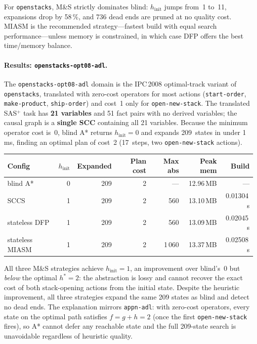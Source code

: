 \documentclass[11pt,a4paper]{article}
\begin{document}
For \texttt{openstacks}, M\&S strictly dominates blind: $h_{\mathrm{init}}$
jumps from~1 to~11, expansions drop by 58\,\%, and 736 dead ends are pruned
at no quality cost.  MIASM is the recommended strategy---fastest build with
equal search performance---unless memory is constrained, in which case DFP
offers the best time/memory balance.

\paragraph{Results: \texttt{openstacks-opt08-adl}.}

The \texttt{openstacks-opt08-adl} domain is the IPC\,2008 optimal-track
variant of \texttt{openstacks}, translated with zero-cost operators for most
actions (\texttt{start-order}, \texttt{make-product}, \texttt{ship-order}) and
cost~1 only for \texttt{open-new-stack}.
The translated SAS$^+$ task has \textbf{21 variables} and 51 fact pairs with
no derived variables; the causal graph is a \textbf{single SCC} containing all
21 variables.
Because the minimum operator cost is~0, blind A* returns
$h_{\mathrm{init}} = 0$ and expands 209~states in under 1\,ms, finding an
optimal plan of cost~2 (17~steps, two \texttt{open-new-stack} actions).

\begin{center}
\small
\begin{tabular}{lrrrrrr}
\toprule
\textbf{Config} & \textbf{$h_{\mathrm{init}}$} & \textbf{Expanded}
  & \textbf{Plan cost} & \textbf{Max abs} & \textbf{Peak mem} & \textbf{Build} \\
\midrule
blind A*            & 0 & 209 & 2 & ---   & 12.96\,MB & ---       \\
SCCS                & 1 & 209 & 2 & 560   & 13.10\,MB & 0.01304\,s  \\
stateless DFP       & 1 & 209 & 2 & 560   & 13.09\,MB & 0.02045\,s  \\
stateless MIASM     & 1 & 209 & 2 & 1\,060 & 13.37\,MB & 0.02508\,s  \\
\bottomrule
\end{tabular}
\end{center}

All three M\&S strategies achieve $h_{\mathrm{init}} = 1$, an improvement over
blind's~0 but \emph{below} the optimal $h^* = 2$: the abstraction is lossy
and cannot recover the exact cost of both stack-opening actions from the initial
state.
Despite the heuristic improvement, all three strategies expand the same 209
states as blind and detect no dead ends.
The explanation mirrors \texttt{appn-adl}: with zero-cost operators, every
state on the optimal path satisfies $f = g + h = 2$ (once the first
\texttt{open-new-stack} fires), so A* cannot defer any reachable state and the
full 209-state search is unavoidable regardless of heuristic quality.
\end{document}
